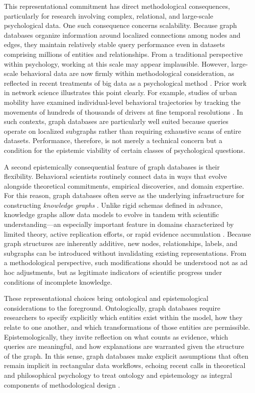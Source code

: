 \documentclass[sn-apa,pdflatex]{sn-jnl}
\theoremstyle{remark}
\theoremstyle{definition}
\begin{document}
This representational commitment has direct methodological consequences,
particularly for research involving complex, relational, and large-scale
psychological data. One such consequence concerns scalability. Because
graph databases organize information around localized connections among
nodes and edges, they maintain relatively stable query performance even
in datasets comprising millions of entities and relationships. From a
traditional perspective within psychology, working at this scale may
appear implausible. However, large-scale behavioral data are now firmly
within methodological consideration, as reflected in recent treatments
of big data as a psychological method \citep{vezzoli2023}. Prior work in
network science illustrates this point clearly. For example, studies of
urban mobility have examined individual-level behavioral trajectories by
tracking the movements of hundreds of thousands of drivers at fine
temporal resolutions \citep{Gonzalez2008}. In such contexts, graph
databases are particularly well suited because queries operate on
localized subgraphs rather than requiring exhaustive scans of entire
datasets. Performance, therefore, is not merely a technical concern but
a condition for the epistemic viability of certain classes of
psychological questions.

A second epistemically consequential feature of graph databases is their
flexibility. Behavioral scientists routinely connect data in ways that
evolve alongside theoretical commitments, empirical discoveries, and
domain expertise. For this reason, graph databases often serve as the
underlying infrastructure for constructing \emph{knowledge graphs}
\citep{Barrasa2023}. Unlike rigid schemas defined in advance, knowledge
graphs allow data models to evolve in tandem with scientific
understanding---an especially important feature in domains characterized
by limited theory, active replication efforts, or rapid evidence
accumulation \citep{burgos2025}. Because graph structures are inherently
additive, new nodes, relationships, labels, and subgraphs can be
introduced without invalidating existing representations. From a
methodological perspective, such modifications should be understood not
as ad hoc adjustments, but as legitimate indicators of scientific
progress under conditions of incomplete knowledge.

These representational choices bring ontological and epistemological
considerations to the foreground. Ontologically, graph databases require
researchers to specify explicitly which entities exist within the model,
how they relate to one another, and which transformations of those
entities are permissible. Epistemologically, they invite reflection on
what counts as evidence, which queries are meaningful, and how
explanations are warranted given the structure of the graph. In this
sense, graph databases make explicit assumptions that often remain
implicit in rectangular data workflows, echoing recent calls in
theoretical and philosophical psychology to treat ontology and
epistemology as integral components of methodological design
\citep{burgos2025}.
\end{document}
